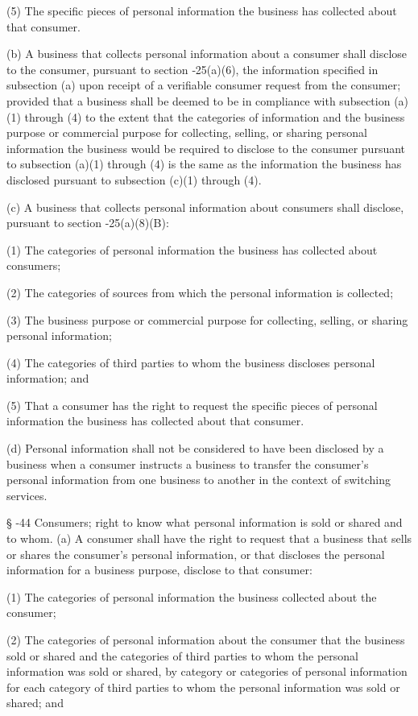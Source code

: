      (5)  The specific pieces of personal information the business has collected about that consumer.

     (b)  A business that collects personal information about a consumer shall disclose to the consumer, pursuant to section    ‑25(a)(6), the information specified in subsection (a) upon receipt of a verifiable consumer request from the consumer; provided that a business shall be deemed to be in compliance with subsection (a)(1) through (4) to the extent that the categories of information and the business purpose or commercial purpose for collecting, selling, or sharing personal information the business would be required to disclose to the consumer pursuant to subsection (a)(1) through (4) is the same as the information the business has disclosed pursuant to subsection (c)(1) through (4).

     (c)  A business that collects personal information about consumers shall disclose, pursuant to section    -25(a)(8)(B):

     (1)  The categories of personal information the business has collected about consumers;

     (2)  The categories of sources from which the personal information is collected;

     (3)  The business purpose or commercial purpose for collecting, selling, or sharing personal information;

     (4)  The categories of third parties to whom the business discloses personal information; and

     (5)  That a consumer has the right to request the specific pieces of personal information the business has collected about that consumer.

     (d)  Personal information shall not be considered to have been disclosed by a business when a consumer instructs a business to transfer the consumer's personal information from one business to another in the context of switching services.

     §   -44  Consumers; right to know what personal information is sold or shared and to whom.  (a)  A consumer shall have the right to request that a business that sells or shares the consumer's personal information, or that discloses the personal information for a business purpose, disclose to that consumer:

     (1)  The categories of personal information the business collected about the consumer;

     (2)  The categories of personal information about the consumer that the business sold or shared and the categories of third parties to whom the personal information was sold or shared, by category or categories of personal information for each category of third parties to whom the personal information was sold or shared; and

